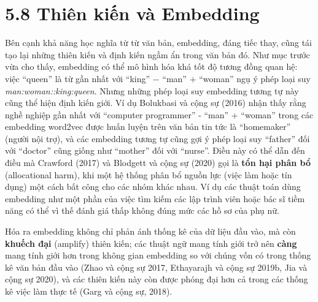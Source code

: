 \section{5.8 Thiên kiến và Embedding}

Bên cạnh khả năng học nghĩa từ từ văn bản, embedding, đáng tiếc thay, cũng tái tạo lại những thiên kiến và định kiến ngầm ẩn trong văn bản đó. Như mục trước vừa cho thấy, embedding có thể mô hình hóa khá tốt độ tương đồng quan hệ: việc ``queen'' là từ gần nhất với ``king'' $-$ ``man'' $+$ ``woman'' ngụ ý phép loại suy \emph{man:woman::king:queen}. Nhưng những phép loại suy embedding tương tự này cũng thể hiện định kiến giới. Ví dụ Bolukbasi và cộng sự (2016) nhận thấy rằng nghề nghiệp gần nhất với ``computer programmer'' - ``man'' + ``woman'' trong các embedding word2vec được huấn luyện trên văn bản tin tức là ``homemaker'' (người nội trợ), và các embedding tương tự cũng gợi ý phép loại suy ``father'' đối với ``doctor'' cũng giống như ``mother'' đối với ``nurse''. Điều này có thể dẫn đến điều mà Crawford (2017) và Blodgett và cộng sự (2020) gọi là \textbf{tổn hại phân bổ} (allocational harm), khi một hệ thống phân bổ nguồn lực (việc làm hoặc tín dụng) một cách bất công cho các nhóm khác nhau. Ví dụ các thuật toán dùng embedding như một phần của việc tìm kiếm các lập trình viên hoặc bác sĩ tiềm năng có thể vì thế đánh giá thấp không đúng mức các hồ sơ của phụ nữ.

Hóa ra embedding không chỉ phản ánh thống kê của dữ liệu đầu vào, mà còn \textbf{khuếch đại} (amplify) thiên kiến; các thuật ngữ mang tính giới trở nên \textbf{càng} mang tính giới hơn trong không gian embedding so với chúng vốn có trong thống kê văn bản đầu vào (Zhao và cộng sự 2017, Ethayarajh và cộng sự 2019b, Jia và cộng sự 2020), và các thiên kiến này còn được phóng đại hơn cả trong các thống kê việc làm thực tế (Garg và cộng sự, 2018).

